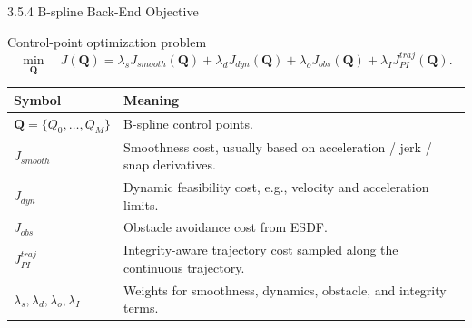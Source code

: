 \documentclass[10pt,aspectratio=169,xcolor=dvipsnames]{beamer}
\begin{document}
\begin{frame}{3.5.4 B-spline Back-End Objective}
  \small
  \begin{block}{Control-point optimization problem}
    \[
      \min_{\mathbf{Q}}\quad
      J(\mathbf{Q})=
      \lambda_sJ_{smooth}(\mathbf{Q})
      +\lambda_dJ_{dyn}(\mathbf{Q})
      +\lambda_oJ_{obs}(\mathbf{Q})
      +\lambda_IJ_{PI}^{traj}(\mathbf{Q}).
    \]
  \end{block}

  \begin{table}\scriptsize
    \begin{tabular}{p{} p{}}
      \toprule
      \textbf{Symbol} & \textbf{Meaning}\\
      \midrule
      $\mathbf{Q}=\{Q_0,\ldots,Q_M\}$ & B-spline control points.\\
      $J_{smooth}$ & Smoothness cost, usually based on acceleration / jerk / snap derivatives.\\
      $J_{dyn}$ & Dynamic feasibility cost, e.g., velocity and acceleration limits.\\
      $J_{obs}$ & Obstacle avoidance cost from ESDF.\\
      $J_{PI}^{traj}$ & Integrity-aware trajectory cost sampled along the continuous trajectory.\\
      $\lambda_s,\lambda_d,\lambda_o,\lambda_I$ & Weights for smoothness, dynamics, obstacle, and integrity terms.\\
      \bottomrule
    \end{tabular}
  \end{table}
\end{frame}
\end{document}
